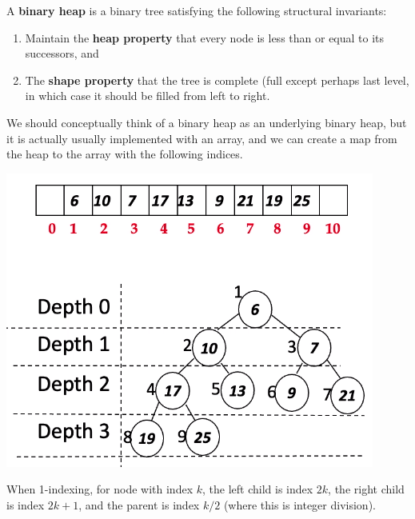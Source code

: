 \documentclass{article}
\begin{document}
    \begin{definition}
    A \textbf{binary heap} is a binary tree satisfying the following structural invariants: 
    \begin{enumerate}
        \item Maintain the \textbf{heap property} that every node is less than or equal to its successors, and 
        \item The \textbf{shape property} that the tree is complete (full except perhaps last level, in which case it should be filled from left to right. 
    \end{enumerate}
    We should conceptually think of a binary heap as an underlying binary heap, but it is actually usually implemented with an array, and we can create a map from the heap to the array with the following indices. 
    \begin{center}
        \includegraphics[scale=0.5]{img/binary_heap.png}
    \end{center}
    When 1-indexing, for node with index $k$, the left child is index $2k$, the right child is index $2k + 1$, and the parent is index $k/2$ (where this is integer division). 
    \end{definition}
\end{document}

